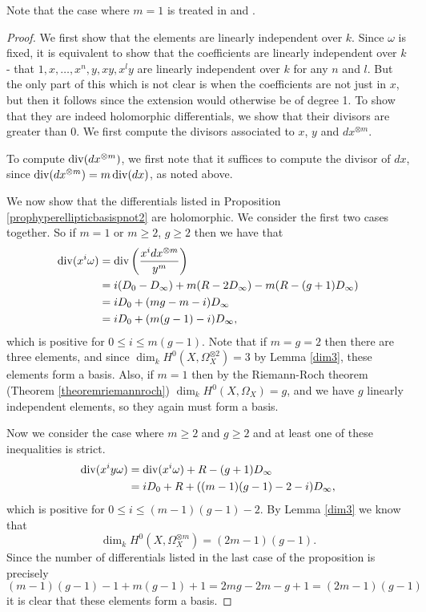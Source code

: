     \begin{rem}
    Note that the case where $m=1$ is treated in \cite[Prop. 7.4.26]{liu} and \cite[Ch. IV, \S 4, Prop. 4.3]{griffiths}.
    \end{rem}
    
    \begin{proof}
    We first show that the elements are linearly independent over $k$.
    Since $\omega$ is fixed, it is equivalent to show that the coefficients are linearly independent over $k$ - \ie that $1,x,\ldots ,x^n, y, xy, x^ly$ are linearly independent over $k$ for any $n$ and $l$.
    But the only part of this which is not clear is when the coefficients are not just in $x$, but then it follows since the extension would otherwise be of degree 1.
    To show that they are indeed holomorphic differentials, we show that their divisors are greater than $0$.
    We first compute the divisors associated to $x$, $y$ and $dx^{\otimes m}$.
    
    To compute $\operatorname{div} (dx^{\otimes m})$, we first note that it suffices to compute the divisor of $dx$, since $\operatorname{div} (dx^{\otimes m}) =m\operatorname{div} (dx)$, as noted above.
    
    
    We now show that the differentials listed in Proposition \ref{prophyperellipticbasispnot2} are holomorphic.
    We consider the first two cases together.
    So if $m=1$ or $m\geq 2$, $g\geq 2$ then we have that
        \begin{align*}
        \operatorname{div}(x^i\omega) & =  \operatorname{div} \left( \frac{x^idx^{\otimes m}}{y^m} \right)\\ 
        & =  i(D_0 -D_\infty) + m(R-2D_\infty) -m(R-(g+1)D_\infty) \\
        & =  iD_0 + (mg -m -i)D_\infty \\
        & =  iD_0 + (m(g-1) -i)D_\infty,
        \end{align*}
    which is positive for $0\leq i \leq m(g-1)$.
    Note that if $m=g=2$ then there are three elements, and since $\dim_kH^0(X,\Omega_X^{\otimes 2})=3$ by Lemma \ref{dim3}, these elements form a basis.
    Also, if $m=1$ then by the Riemann-Roch theorem (Theorem \ref{theoremriemannroch}) $\dim_k H^0(X,\Omega_X)=g$, and we have $g$ linearly independent elements, so they again must form a basis.
    
    
    
    Now we consider the case where $m\geq 2$ and $g \geq 2$ and at least one of these inequalities is strict.
        \begin{align*}
        \operatorname{div} (x^iy\omega) & =  \operatorname{div}(x^i\omega) + R -(g+1)D_\infty \\
        & =  iD_0 + R +((m-1)(g-1)-2-i)D_\infty,
        \end{align*}
    which is positive for $0\leq i \leq (m-1)(g-1)-2$.
    By Lemma \ref{dim3} we know that 
        \[
        \dim_kH^0(X,\Omega_X^{\otimes m}) = (2m-1)(g-1).
        \]
    Since the number of differentials listed in the last case of the proposition is precisely
        \[
        (m-1)(g-1)-1 + m(g-1) +1 = 2mg -2m -g + 1 = (2m-1)(g-1)
        \]
    it is clear that these elements form a basis.
    \end{proof}


